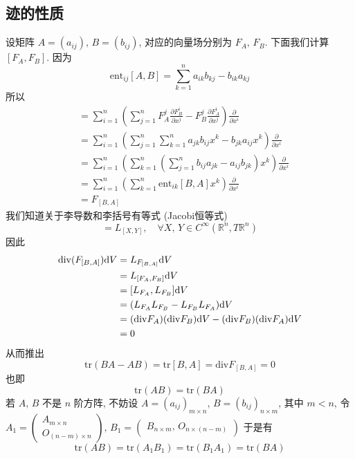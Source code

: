     \subsection{迹的性质}
    设矩阵 $A = (a_{ij}),\,B = (b_{ij})$, 对应的向量场分别为 $F_A,\,F_B$. 下面我们计算 $[F_A, F_B]$. 因为
    \begin{equation*}
        \mathrm{ent}_{ij}[A,B] = \sum_{k=1}^{n}a_{ik}b_{kj}-b_{ik}a_{kj}
    \end{equation*}
    所以
    \begin{align*}
        [F_A,F_B] &= \sum_{i=1}^{n}\left(\sum_{j=1}^{n}F_A^j\frac{\partial F_B^i}{\partial x^j}-F_B^j\frac{\partial F_A^i}{\partial x^j}\right)\frac{\partial}{\partial x^i} \\
        &= \sum_{i=1}^{n}\left(\sum_{j=1}^{n}\sum_{k=1}^{n}a_{jk}b_{ij}x^k-b_{jk}a_{ij}x^k\right)\frac{\partial}{\partial x^i} \\
        &= \sum_{i=1}^{n}\left(\sum_{k=1}^{n}\left(\sum_{j=1}^{n}b_{ij}a_{jk}-a_{ij}b_{jk}\right)x^k\right)\frac{\partial}{\partial x^i} \\
        &= \sum_{i=1}^{n}\left(\sum_{k=1}^{n}\mathrm{ent}_{ik}[B,A]x^k\right)\frac{\partial}{\partial x^i} \\
        &= F_{[B,A]}
    \end{align*}
    我们知道关于李导数和李括号有等式 (Jacobi恒等式)
    \begin{equation*}
        [L_X, L_Y] = L_{[X,Y]}, \quad\forall X,\,Y\in C^{\infty}(\mathbb{R}^n,T\mathbb{R}^n)
    \end{equation*}
    因此
    \begin{align*}
        \mathrm{div}(F_{[B,A]}){\rm d} V &= L_{F_{[B,A]}}{\rm d} V \\
        &= L_{[F_A,F_B]}{\rm d} V \\
        &= [L_{F_A},L_{F_B}]{\rm d} V \\
        &= (L_{F_A}L_{F_B}-L_{F_B}L_{F_A}){\rm d} V \\
        &= (\mathrm{div}F_A)(\mathrm{div}F_B){\rm d} V - (\mathrm{div}F_B)(\mathrm{div}F_A){\rm d} V \\
        &= 0
    \end{align*}
    从而推出
    \begin{equation*}
        \mathrm{tr}(BA-AB) = \mathrm{tr}[B,A] = \mathrm{div}F_{[B,A]} = 0
    \end{equation*}
    也即
    \begin{equation*}
        \mathrm{tr}(AB) = \mathrm{tr}(BA)
    \end{equation*}
    若 $A,\,B$ 不是 $n$ 阶方阵, 不妨设 $A = (a_{ij})_{m\times n},\,B = (b_{ij})_{n\times m}$, 其中 $m<n$,
    令 $A_1 = \begin{pmatrix}
        A_{m\times n} \\ O_{(n-m)\times n}
    \end{pmatrix},\,B_1 = \begin{pmatrix}
        B_{n\times m},\,O_{n\times(n-m)}
    \end{pmatrix}$
    于是有
    \begin{equation*}
        \mathrm{tr}(AB) = \mathrm{tr}(A_1B_1) = \mathrm{tr}(B_1A_1) = \mathrm{tr}(BA)
    \end{equation*}

